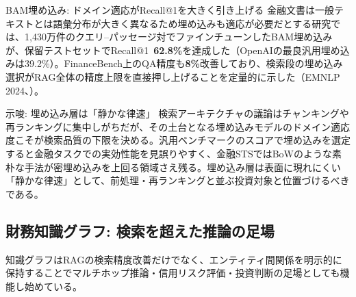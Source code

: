 \begin{casestudy}{BAM埋め込み: ドメイン適応がRecall@1を大きく引き上げる}
金融文書は一般テキストとは語彙分布が大きく異なるため埋め込みも適応が必要だとする研究では、1,430万件のクエリ–パッセージ対でファインチューンしたBAM埋め込みが、保留テストセットでRecall@1\ \textbf{62.8\%}を達成した（OpenAIの最良汎用埋め込みは39.2\%）。FinanceBench上のQA精度も\textbf{8\%}改善しており、検索段の埋め込み選択がRAG全体の精度上限を直接押し上げることを定量的に示した（EMNLP 2024、\cite{x02bamembeddings2024}）。
\end{casestudy}

\begin{insight}{示唆: 埋め込み層は「静かな律速」}
検索アーキテクチャの議論はチャンキングや再ランキングに集中しがちだが、その土台となる埋め込みモデルのドメイン適応度こそが検索品質の下限を決める。汎用ベンチマークのスコアで埋め込みを選定すると金融タスクでの実効性能を見誤りやすく、金融STSではBoWのような素朴な手法が密埋め込みを上回る領域さえ残る。埋め込み層は表面に現れにくい「静かな律速」として、前処理・再ランキングと並ぶ投資対象と位置づけるべきである。
\end{insight}

\subsection{財務知識グラフ: 検索を超えた推論の足場}

知識グラフはRAGの検索精度改善だけでなく、エンティティ間関係を明示的に保持することでマルチホップ推論・信用リスク評価・投資判断の足場としても機能し始めている。

